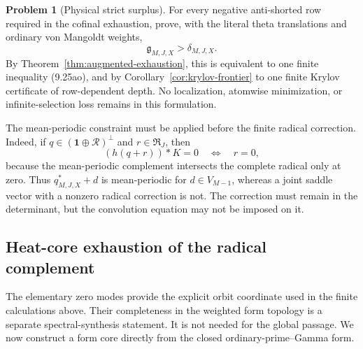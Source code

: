 \documentclass[11pt]{amsart}
\theoremstyle{definition}
\newtheorem{problem}[theorem]{Problem}
\theoremstyle{remark}
\begin{document}
\begin{problem}[Physical strict surplus]
\label{prob:physical-strict-surplus}
For every negative anti-shorted row required in the cofinal exhaustion,
prove, with the literal theta translations and ordinary von Mangoldt
weights,
\[
 \boxed{\mathfrak g_{M,J,X}>\delta_{M,J,X}.}
\tag{9.25bi}
\]
By Theorem~\ref{thm:augmented-exhaustion}, this is equivalent to one
finite inequality (9.25ao), and by
Corollary~\ref{cor:krylov-frontier} to one finite Krylov certificate of
row-dependent depth.  No localization, atomwise minimization, or
infinite-selection loss remains in this formulation.
\end{problem}

The mean-periodic constraint must be applied before the finite radical
correction.  Indeed, if
\(q\in(\mathbf1\oplus\mathcal R)^\perp\) and
\(r\in\mathfrak R_J\), then
\[
 (h(q+r))*K=0
 \quad\Longleftrightarrow\quad r=0,
\]
because the mean-periodic complement intersects the complete radical only
at zero.  Thus \(q_{M,J,X}^*+d\) is mean-periodic for
\(d\in V_{M-1}\), whereas a joint saddle vector with a nonzero radical
correction is not.  The correction must remain in the determinant, but the
convolution equation may not be imposed on it.

\subsection{Heat-core exhaustion of the radical complement}
\label{subsec:heat-core}

The elementary zero modes provide the explicit orbit coordinate used in
the finite calculations above.  Their completeness in the weighted form
topology is a separate spectral-synthesis statement.  It is not needed for
the global passage.  We now construct a form core directly from the closed
ordinary-prime--Gamma form.
\end{document}
